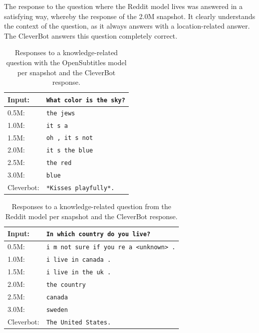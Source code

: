 The response to the question where the Reddit model lives was answered in a satisfying way, whereby the response of the 2.0M snapshot. It clearly understands the context of the question, as it always answers with a location-related answer. The CleverBot answers this question completely correct.

\begin{table}[H]
	\centering
	\begin{adjustbox}{max width=\textwidth}
		\begin{tabularx}{\textwidth}{lX}
			\toprule
			Input: 	& \texttt{What color is the sky?}\\
			\midrule
			0.5M: 	& \texttt{the jews}\\
			1.0M: 	& \texttt{it s a}\\
			1.5M:	& \texttt{oh , it s not}\\
			2.0M:	& \texttt{it s the blue}\\
			2.5M:	& \texttt{the red}\\
			3.0M:	& \texttt{blue}\\
			Cleverbot:&\texttt{*Kisses playfully*.}\\
			\bottomrule
		\end{tabularx}
	\end{adjustbox}
	\caption{Responses to a knowledge-related question with the OpenSubtitles model per snapshot and the CleverBot response.}
	\label{results:example3_output:OpenSubtitle_compared}
\end{table}
\begin{table}[H]
	\centering
	\begin{adjustbox}{max width=\textwidth}
		\begin{tabularx}{\textwidth}{lX}
			\toprule
			Input: 	& \texttt{In which country do you live?}\\
			\midrule
			0.5M: 	& \texttt{i m not sure if you re a <unknown> .}\\
			1.0M: 	& \texttt{i live in canada .}\\
			1.5M:	& \texttt{i live in the uk .}\\
			2.0M:	& \texttt{the country}\\
			2.5M:	& \texttt{canada}\\
			3.0M:	& \texttt{sweden}\\
			Cleverbot:&\texttt{The United States.}\\
			\bottomrule
		\end{tabularx}
	\end{adjustbox}
	\caption{Responses to a knowledge-related question from the Reddit model per snapshot and the CleverBot response.}
	\label{results:example3_output:Reddit_compared}
\end{table}

